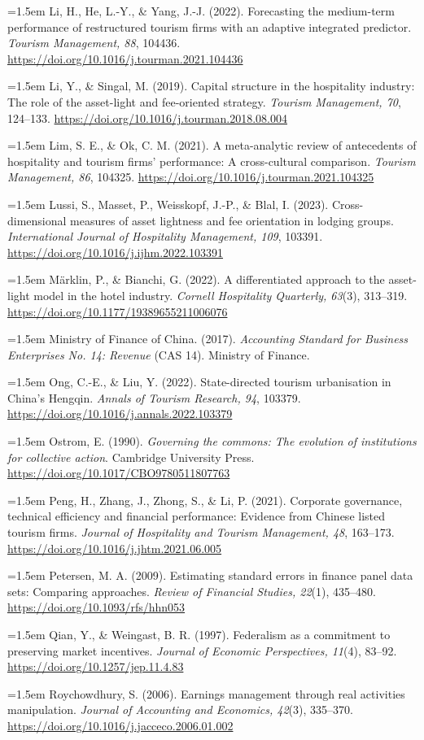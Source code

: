 \documentclass[review,3p,times]{elsarticle}
\def\refitem#1{\noindent\hangindent=1.5em\hangafter=1 #1\par\medskip}
\begin{document}
\refitem{Li, H., He, L.-Y., \& Yang, J.-J. (2022). Forecasting the medium-term performance of restructured tourism firms with an adaptive integrated predictor. \emph{Tourism Management, 88}, 104436. \url{https://doi.org/10.1016/j.tourman.2021.104436}}
\refitem{Li, Y., \& Singal, M. (2019). Capital structure in the hospitality industry: The role of the asset-light and fee-oriented strategy. \emph{Tourism Management, 70}, 124--133. \url{https://doi.org/10.1016/j.tourman.2018.08.004}}
\refitem{Lim, S. E., \& Ok, C. M. (2021). A meta-analytic review of antecedents of hospitality and tourism firms' performance: A cross-cultural comparison. \emph{Tourism Management, 86}, 104325. \url{https://doi.org/10.1016/j.tourman.2021.104325}}
\refitem{Lussi, S., Masset, P., Weisskopf, J.-P., \& Blal, I. (2023). Cross-dimensional measures of asset lightness and fee orientation in lodging groups. \emph{International Journal of Hospitality Management, 109}, 103391. \url{https://doi.org/10.1016/j.ijhm.2022.103391}}
\refitem{Märklin, P., \& Bianchi, G. (2022). A differentiated approach to the asset-light model in the hotel industry. \emph{Cornell Hospitality Quarterly, 63}(3), 313--319. \url{https://doi.org/10.1177/19389655211006076}}
\refitem{Ministry of Finance of China. (2017). \emph{Accounting Standard for Business Enterprises No. 14: Revenue} (CAS 14). Ministry of Finance.}
\refitem{Ong, C.-E., \& Liu, Y. (2022). State-directed tourism urbanisation in China's Hengqin. \emph{Annals of Tourism Research, 94}, 103379. \url{https://doi.org/10.1016/j.annals.2022.103379}}
\refitem{Ostrom, E. (1990). \emph{Governing the commons: The evolution of institutions for collective action}. Cambridge University Press. \url{https://doi.org/10.1017/CBO9780511807763}}
\refitem{Peng, H., Zhang, J., Zhong, S., \& Li, P. (2021). Corporate governance, technical efficiency and financial performance: Evidence from Chinese listed tourism firms. \emph{Journal of Hospitality and Tourism Management, 48}, 163--173. \url{https://doi.org/10.1016/j.jhtm.2021.06.005}}
\refitem{Petersen, M. A. (2009). Estimating standard errors in finance panel data sets: Comparing approaches. \emph{Review of Financial Studies, 22}(1), 435--480. \url{https://doi.org/10.1093/rfs/hhn053}}
\refitem{Qian, Y., \& Weingast, B. R. (1997). Federalism as a commitment to preserving market incentives. \emph{Journal of Economic Perspectives, 11}(4), 83--92. \url{https://doi.org/10.1257/jep.11.4.83}}
\refitem{Roychowdhury, S. (2006). Earnings management through real activities manipulation. \emph{Journal of Accounting and Economics, 42}(3), 335--370. \url{https://doi.org/10.1016/j.jacceco.2006.01.002}}
\end{document}
